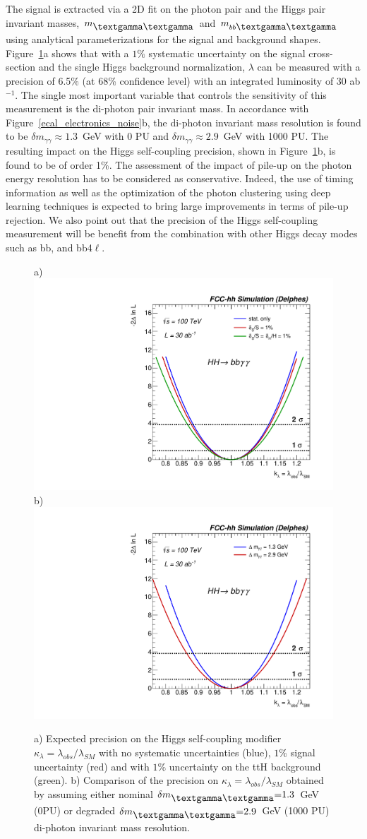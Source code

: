 \documentclass[11pt,twoside,a4paper]{cernrep}
\begin{document}
The signal is extracted via a 2D fit on the photon pair and the Higgs pair invariant masses, $m_{\mbox{\textgamma\textgamma}}$ and $m_{b b\rm \mbox{\textgamma\textgamma}}$ using analytical parameterizations for the signal and background shapes. Figure~\ref{higgs}a shows that with a $1\%$ systematic uncertainty on the signal cross-section and the single Higgs background normalization, $\lambda$ can be measured with a precision of 6.5\% (at 68\% confidence level) with an integrated luminosity of 30 ab$^{-1}$. The single most important variable that controls the sensitivity of this measurement is the di-photon pair invariant mass.
In accordance with Figure~\ref{ecal_electronics_noise}b, the di-photon invariant mass resolution is found to be $\delta m_{\gamma\gamma}\approx 1.3$~GeV with 0 PU and $\delta m_{\gamma\gamma}\approx 2.9$~GeV with 1000 PU. The resulting impact on the Higgs self-coupling precision, shown in Figure~\ref{higgs}b, is found to be of order 1\%. The assessment of the impact of pile-up on the photon energy resolution has to be considered as conservative. Indeed, the use of timing information as well as the optimization of the photon clustering using deep learning techniques is expected to bring large improvements in terms of pile-up rejection. We also point out that the precision of the Higgs self-coupling measurement will be benefit from the combination with other Higgs decay modes such as bb\texttau\texttau, and bb4$\ell$.
%
\begin{figure}
  \centering
  a)
  \includegraphics[width=0.42\columnwidth]{hh_syst.pdf}
  b)
  \includegraphics[width=0.42\columnwidth]{hh_gamma.pdf}
  \caption{ a) Expected precision on the Higgs self-coupling modifier $\kappa_{\lambda}{=}\lambda_{obs}/\lambda_{SM}$ with no systematic uncertainties (blue), $1\%$ signal uncertainty (red) and with $1\%$ uncertainty on the ttH background (green). b) Comparison of the precision on $\kappa_{\lambda}{=}\lambda_{obs}/\lambda_{SM}$ obtained by assuming either nominal $\delta m_{\mbox{\textgamma\textgamma}} {=}1.3$~GeV (0PU) or degraded $\delta m_{\mbox{\textgamma\textgamma}}{=}2.9$~GeV (1000 PU) di-photon invariant mass resolution.}
  \label{higgs}
\end{figure}
\end{document}
